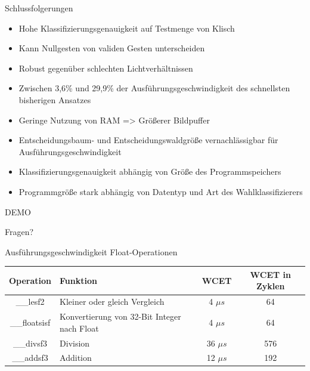 \documentclass[10pt]{beamer}
\begin{document}
\begin{frame}{Schlussfolgerungen}
\begin{itemize}
    \item Hohe Klassifizierungsgenauigkeit auf Testmenge von Klisch
    \item Kann Nullgesten von validen Gesten unterscheiden
    \item Robust gegenüber schlechten Lichtverhältnissen
    \item Zwischen 3,6\% und 29,9\% der Ausführungsgeschwindigkeit des schnellsten bisherigen Ansatzes
    \item Geringe Nutzung von RAM => Größerer Bildpuffer
    \item Entscheidungsbaum- und Entscheidungswaldgröße vernachlässigbar für Ausführungsgeschwindigkeit
    \item Klassifizierungsgenauigkeit abhängig von Größe des Programmspeichers 
    \item Programmgröße stark abhängig von Datentyp und Art des Wahlklassifizierers
\end{itemize}
\end{frame}

\begin{frame}[standout]
  DEMO
\end{frame}

\begin{frame}[standout]
  Fragen?
\end{frame}

\begin{frame}{Ausführungsgeschwindigkeit Float-Operationen}
\centering
\begin{tabular}{ | c | p{4cm} | c | c |}
    \hline
    Operation & Funktion & WCET & WCET in Zyklen \\\hline
    \_\_lesf2 & Kleiner oder gleich Vergleich & 4 $\mu s$ & 64 \\\hline
    \_\_floatsisf & Konvertierung von 32-Bit Integer nach Float & 4 $\mu s$ & 64 \\\hline
    \_\_divsf3 & Division & 36 $\mu s$ & 576 \\\hline
    \_\_addsf3 & Addition & 12 $\mu s$ & 192 \\\hline
\end{tabular}
\end{frame}
\end{document}
